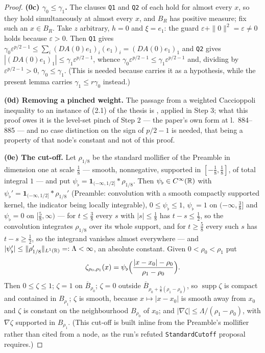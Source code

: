 \begin{proof}
\textbf{(0c) $\gamma_0\le\gamma_1$.}  The clauses \texttt{Q1} and \texttt{Q2} of
 each hold for almost every $x$, so they hold
simultaneously at almost every $x$, and $B_R$ has positive measure; fix such an
$x\in B_R$.  Take $z$ arbitrary, $h=0$ and $\xi=e_1$: the guard
$\varepsilon+\|0\|^2=\varepsilon\ne0$ holds because $\varepsilon>0$.  Then
\texttt{Q1} gives
$\gamma_0\varepsilon^{p/2-1}\le\sum_i(D A(0)e_1)_i(e_1)_i=(DA(0)e_1)_1$ and
\texttt{Q2} gives $|(DA(0)e_1)_1|\le\gamma_1\varepsilon^{p/2-1}$, whence
$\gamma_0\varepsilon^{p/2-1}\le\gamma_1\varepsilon^{p/2-1}$ and, dividing by
$\varepsilon^{p/2-1}>0$, $\gamma_0\le\gamma_1$.  (This is needed because
 carries it as a hypothesis, while the
present lemma carries $\gamma_1\le r\gamma_0$ instead.)

\textbf{(0d) Removing a pinched weight.}  The passage from a weighted
Caccioppoli inequality to an instance of (2.1) of the thesis is
, applied in Step 3; what this proof owes
it is the level-set pinch of Step 2 --- the paper's own form at l.~884--885 ---
and no case distinction on the sign of $p/2-1$ is needed, that being a property
of that node's constant and not of this proof.

\textbf{(0e) The cut-off.}  Let $\rho_{1/8}$ be the standard mollifier of the
Preamble in dimension one at scale $\tfrac18$ --- smooth, nonnegative, supported
in $[-\tfrac18,\tfrac18]$, of total integral $1$ --- and put
$\psi_\flat=\mathbf1_{(-\infty,1/2]}*\rho_{1/8}$.  Then
$\psi_\flat\in C^\infty(\mathbb{R})$ with
$\psi_\flat'=\mathbf1_{(-\infty,1/2]}*\rho_{1/8}'$ (Preamble: convolution with a
smooth compactly supported kernel, the indicator being locally integrable),
$0\le\psi_\flat\le1$, $\psi_\flat=1$ on $(-\infty,\tfrac38]$ and $\psi_\flat=0$
on $[\tfrac58,\infty)$ --- for $t\le\tfrac38$ every $s$ with $|s|\le\tfrac18$ has
$t-s\le\tfrac12$, so the convolution integrates $\rho_{1/8}$ over its whole
support, and for $t\ge\tfrac58$ every such $s$ has $t-s\ge\tfrac12$, so the
integrand vanishes almost everywhere --- and
$|\psi_\flat'|\le\|\rho_{1/8}'\|_{L^1(\mathbb{R})}=:\Lambda<\infty$, an absolute
constant.  Given $0<\rho_0<\rho_1$ put
\[
\zeta_{\rho_0,\rho_1}(x)=\psi_\flat\Bigl(\frac{|x-x_0|-\rho_0}{\rho_1-\rho_0}\Bigr).
\]
Then $0\le\zeta\le1$; $\zeta=1$ on $\overline B_{\rho_0}$; $\zeta=0$ outside
$\overline B_{\rho_0+\frac58(\rho_1-\rho_0)}$, so $\operatorname{supp}\zeta$ is
compact and contained in $B_{\rho_1}$; $\zeta$ is smooth, because
$x\mapsto|x-x_0|$ is smooth away from $x_0$ and $\zeta$ is constant on the
neighbourhood $B_{\rho_0}$ of $x_0$; and
$|\nabla\zeta|\le\Lambda/(\rho_1-\rho_0)$, with $\nabla\zeta$ supported in
$B_{\rho_1}$.  (This cut-off is built inline from the Preamble's mollifier
rather than cited from a node, as the run's refuted \texttt{StandardCutoff}
proposal requires.)


\end{proof}
